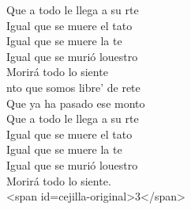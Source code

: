 \begin{cancion}
	Que a todo le llega a su rte\\
	Igual que se muere el tato\\
	Igual que se muere la te\\
	Igual que se murió louestro\\
	Morirá todo lo siente\\
\jump
	nto que somos libre' de rete\\
	Que ya ha pasado ese monto\\
	Que a todo le llega a su rte\\
	Igual que se muere el tato\\
	Igual que se muere la te\\
	Igual que se murió louestro\\
	Morirá todo lo siente.\\
<span id=cejilla-original>3</span>\\
\end{cancion}%
